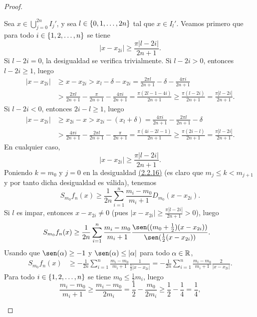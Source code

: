 \documentclass[a4paper, 12pt, oneside]{book}
\begin{document}
\begin{proof}
\begin{itemize}
        Sea $x \in \bigcup_{j=0}^{2n}I_j'$, y sea $l \in \{0,1,\mathellipsis,2n\}$ tal que $x \in I_l'$. Veamos primero que para todo $i \in \{1,2,\mathellipsis,n\}$ se tiene
        \[|x-x_{2i}| \geq \frac{\pi |l -2i|}{2n+1}.\]
        Si $l -2i = 0$, la desigualdad se verifica trivialmente. Si $l - 2i > 0$, entonces $l - 2i \geq 1$, luego
        \begin{align*}
            |x-x_{2i}| &\geq x-x_{2i} > x_l-\delta-x_{2i} = \frac{2\pi l}{2n+1}-\delta-\frac{4\pi i}{2n+1} \\ &> \frac{2\pi l}{2n+1}-\frac{\pi}{2n+1}-\frac{4\pi i}{2n+1}
            = \frac{\pi(2l-1-4i)}{2n+1} \geq \frac{\pi(l-2i)}{2n+1} = \frac{\pi|l-2i|}{2n+1}.
        \end{align*}
        Si $l - 2i < 0$, entonces $2i - l \geq 1$, luego
        \begin{align*}
            |x-x_{2i}| &\geq x_{2i}-x > x_{2i} - (x_l+\delta) = \frac{4\pi i}{2n+1} - \frac{2\pi l}{2n+1} - \delta \\ &>\frac{4\pi i}{2n+1} - \frac{2\pi l}{2n+1} -\frac{\pi}{2n+1}
            = \frac{\pi(4i-2l-1)}{2n+1} \geq \frac{\pi(2i-l)}{2n+1} = \frac{\pi|l-2i|}{2n+1}.
        \end{align*}
        En cualquier caso,
        \[|x-x_{2i}| \geq \frac{\pi |l -2i|}{2n+1}.\]
        Poniendo $k = m_0$ y $j = 0$ en la desigualdad \hyperref[2.2.16]{\color{blue}(2.2.16)} (es claro que $m_j \leq k < m_{j+1}$ y por tanto dicha desigualdad es válida), tenemos
        \[S_{m_0}f_n(x) \geq \frac{1}{2n}\sum_{i=1}^n \frac{m_i - m_0}{m_i + 1}D_{m_0}(x-x_{2i}).\]
        Si $l$ es impar, entonces $x-x_{2i} \neq 0$ (pues $|x-x_{2i}| \geq \frac{\pi |l-2i|}{2n+1} > 0$), luego
        \begin{align*}
            S_{m_0}f_n(x) &\geq \frac{1}{2n}\sum_{i=1}^n \frac{m_i-m_0}{m_i+1}\frac{\sen((m_0+\frac{1}{2})(x-x_{2i}))}{\sen(\frac{1}{2}(x-x_{2i}))}.
        \end{align*}
        Usando que $\sen(\alpha) \geq -1$ y $\sen(\alpha)\leq |\alpha|$ para todo $\alpha \in \mathbb R$,
        \begin{align*}
            S_{m_0}f_n(x) &\geq -\frac{1}{2n}\sum_{i=1}^n \frac{m_i-m_0}{m_i+1}\frac{1}{\frac{1}{2}|x-x_{2i}|} = -\frac{1}{2n}\sum_{i=1}^n \frac{m_i-m_0}{m_i+1}\frac{2}{|x-x_{2i}|} .
        \end{align*}
        Para todo $i \in \{1,2,\mathellipsis,n\}$ se tiene $m_0 \leq \frac{1}{2}m_i$, luego \[\frac{m_i-m_0}{m_i+1} \geq \frac{m_i-m_0}{2m_i} = \frac{1}{2}-\frac{m_0}{2m_i} \geq \frac{1}{2}-\frac{1}{4} = \frac{1}{4},\]

\end{itemize}
\end{proof}
\end{document}
